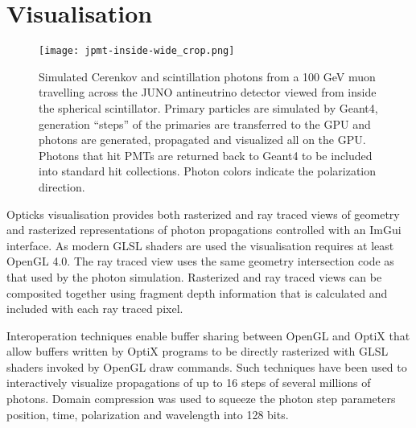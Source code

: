 \documentclass[a4paper]{jpconf}
\begin{document}

\section{Visualisation}

\begin{figure}[htbp]
\centering
\texttt{[image: jpmt-inside-wide\_crop.png]}
%
\caption{Simulated Cerenkov and scintillation photons from a 100 GeV muon travelling
across the JUNO antineutrino detector viewed from inside the spherical scintillator.
Primary particles are simulated by Geant4, generation ``steps'' of the primaries
are transferred to the GPU and photons are generated, propagated and visualized
all on the GPU. Photons that hit PMTs
are returned back to Geant4 to be included into standard hit collections.
Photon colors indicate the polarization direction.}
\end{figure}

Opticks visualisation provides both rasterized and ray traced views 
of geometry and rasterized representations of photon propagations
controlled with an ImGui\cite{ImGui} interface. As modern GLSL 
shaders are used the visualisation requires at least OpenGL 4.0.
The ray traced view uses the same geometry intersection 
code as that used by the photon simulation.  
Rasterized and ray traced views can be composited together using fragment 
depth information that is calculated and included with each ray traced pixel.

Interoperation techniques enable buffer sharing between OpenGL and OptiX 
that allow buffers written by OptiX programs to be directly rasterized 
with GLSL shaders invoked by OpenGL draw commands. Such techniques 
have been used to interactively visualize propagations of up to 16 
steps of several millions of photons. Domain compression was used 
to squeeze the photon step parameters position, time, polarization 
and wavelength into 128 bits. 
\end{document}

